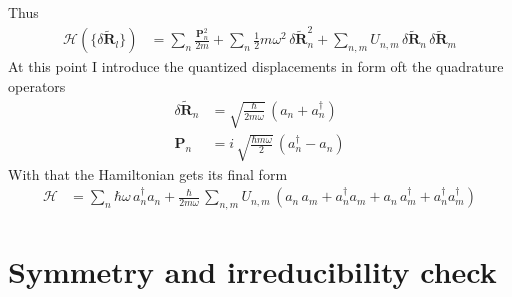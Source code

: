 Thus
\begin{align*}
    \mathcal{H}(\{\delta\tilde{\mathbf{R}}_l\})&= \sum_n\frac{\mathbf{P}_n^2}{2m}+ \sum_n\frac12 m\omega^2\,\delta\tilde{\mathbf{R}}_n^2+ \sum_{n,m}U_{n,m}\,\delta\tilde{\mathbf{R}}_n\,\delta\tilde{\mathbf{R}}_m
\end{align*}
At this point I introduce the quantized displacements in form oft the quadrature operators 
\begin{align*}
    \delta\tilde{\mathbf{R}}_n &= \sqrt{\frac{\hbar}{2m\omega}}\,(a_n + a_n^\dagger)\\
    \mathbf{P}_n &= i\,\sqrt{\frac{\hbar m\omega}{2}}\,(a_n^\dagger - a_n)
\end{align*}
With that the Hamiltonian gets its final form
\begin{align*}
    \mathcal{H} &= \sum_n \hbar\omega\,a_n^\dagger a_n +\frac{\hbar}{2m\omega}\, \sum_{n,m} U_{n,m}\,\left(a_n\,a_m + a_n^\dagger a_m + a_n\,a_m^\dagger + a_n^\dagger a_m^\dagger \right)
\end{align*}\hfill\newpage

\chapter{Symmetry and irreducibility check}
    \label{appendix:symmetry}

